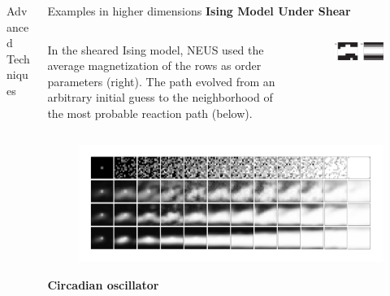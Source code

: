 \documentclass[final]{beamer}
\begin{document}
\begin{columns}[t]
\begin{column}{.33\linewidth}
\begin{block}{Advanced Techniques}
        \end{block}
      \end{column}
      \begin{column}{.33\linewidth}
	\begin{block}{Examples in higher dimensions}
	  \textbf{Ising Model Under Shear}
	  \begin{columns}[t]
	    \begin{column}{.65\linewidth}
	      In the sheared Ising model, NEUS used the average magnetization of the rows as order parameters (right).  The path evolved from an arbitrary initial guess to the neighborhood of the most probable reaction path (below). 
	    \end{column}
	    \begin{column}{.25\linewidth}
	      \begin{figure}
		\includegraphics[width=3 in]{images/cg.pdf}
	      \end{figure}
	    \end{column}
	  \end{columns}
	  \begin{figure}
 	    \includegraphics[width=12 in]{images/rows16.pdf}
	  \end{figure}
	  \vspace{10 mm}
	  \textbf{Circadian oscillator}


\end{block}
\end{column}
\end{columns}
\end{document}
